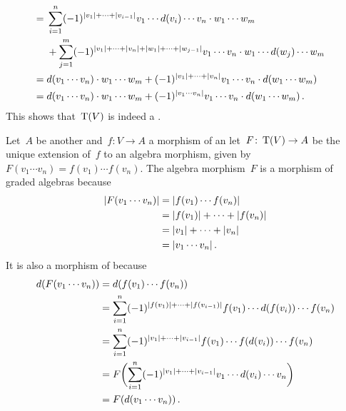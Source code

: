 \documentclass[a4paper,10pt,headings=standardclasses]{scrartcl}
\begin{document}
\begin{enumerate}[start=2]
\begin{gather*}
\begin{aligned}
        \\
        ={}&
        \sum_{i=1}^n
        (-1)^{\lvert v_1\rvert + \dotsb + \lvert v_{i-1}\rvert}
        v_1 \dotsm d(v_i) \dotsm v_n \cdot w_1 \dotsm w_m
        \\
        {}&
        +
        \sum_{j=1}^m
        (-1)^{\lvert v_1\rvert + \dotsb + \lvert v_n\rvert + \lvert w_1\rvert + \dotsb + \lvert w_{j-1}\rvert}
        v_1 \dotsm v_n \cdot w_1 \dotsm d(w_j) \dotsm w_m
        \\
        ={}&
        d(v_1 \dotsm v_n) \cdot w_1 \dotsm w_m
        +
        (-1)^{\lvert v_1\rvert + \dotsb + \lvert v_n\rvert}
        v_1 \dotsm v_n \cdot d(w_1 \dotsm w_m)
        \\
        ={}&
        d(v_1 \dotsm v_n) \cdot w_1 \dotsm w_m
        +
        (-1)^{\lvert v_1 \dotsm v_n\rvert}
        v_1 \dotsm v_n \cdot d(w_1 \dotsm w_m) \,.
      \end{aligned}
    \end{gather*}
    This shows that~$\operatorname{T}(V)$ is indeed a {\dga}.
    
    Let~$A$ be another {\dga} and~$f \colon V \to A$ a morphism of {\dgvs} an let~$F \colon \operatorname{T}(V) \to A$ be the unique extension of~$f$ to an algebra morphism, given by~$F(v_1 \dotsm v_n) = f(v_1) \dotsm f(v_n)$.
    The algebra morphism~$F$ is a morphism of graded algebras because
    \begin{align*}
      \lvert F(v_1 \dotsm v_n)\rvert
      &=
      \lvert f(v_1) \dotsm f(v_n)\rvert
      \\
      &=
      \lvert f(v_1)\rvert + \dotsb + \lvert f(v_n)\rvert
      \\
      &=
      \lvert v_1\rvert + \dotsb + \lvert v_n\rvert
      \\
      &=
      \lvert v_1 \dotsm v_n\rvert \,.
    \end{align*}
    It is also a morphism of {\dgvs} because
    \begin{align*}
      d(F(v_1 \dotsm v_n))
      &=
      d( f(v_1) \dotsm f(v_n) )
      \\
      &=
      \sum_{i=1}^n
      (-1)^{\lvert f(v_1)\rvert + \dotsb + \lvert f(v_{i-1})\rvert }
      f(v_1) \dotsm d(f(v_i)) \dotsm f(v_n)
      \\
      &=
      \sum_{i=1}^n
      (-1)^{\lvert v_1\rvert + \dotsb + \lvert v_{i-1}\rvert }
      f(v_1) \dotsm f(d(v_i)) \dotsm f(v_n)
      \\
      &=
      F\biggl(
        \sum_{i=1}^n
        (-1)^{\lvert v_1\rvert + \dotsb + \lvert v_{i-1}\rvert }
        v_1 \dotsm d(v_i) \dotsm v_n
      \biggr)
      \\
      &=
      F(d(v_1 \dotsm v_n)) \,.
    \end{align*}

\end{enumerate}
\end{document}
